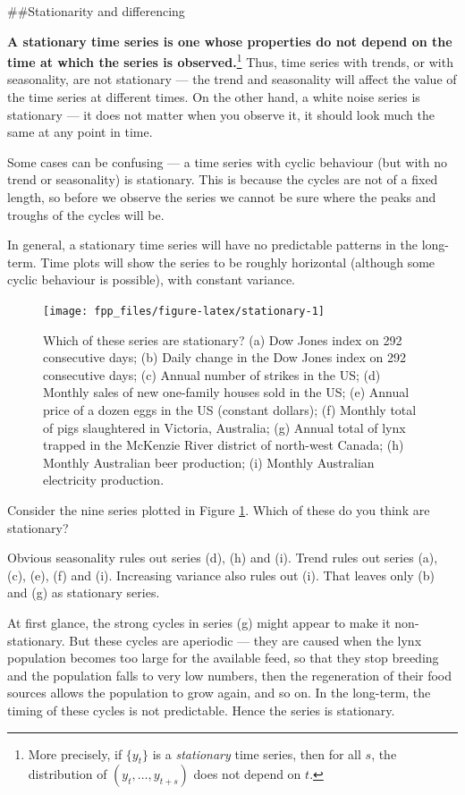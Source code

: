 \documentclass[]{book}
\let\rmarkdownfootnote\footnote%
\def\footnote{\protect\rmarkdownfootnote}
\begin{document}
\#\#Stationarity and differencing

\textbf{A stationary time series is one whose properties do not depend on the time at which the series is observed.}\footnote{More precisely, if \(\{y_t\}\) is a \emph{stationary} time series, then for all \(s\), the distribution of \((y_t,\dots,y_{t+s})\) does not depend on \(t\).} Thus, time series with trends, or with seasonality, are not stationary --- the trend and seasonality will affect the value of the time series at different times. On the other hand, a white noise series is stationary --- it does not matter when you observe it, it should look much the same at any point in time.

Some cases can be confusing --- a time series with cyclic behaviour (but with no trend or seasonality) is stationary. This is because the cycles are not of a fixed length, so before we observe the series we cannot be sure where the peaks and troughs of the cycles will be.

In general, a stationary time series will have no predictable patterns in the long-term. Time plots will show the series to be roughly horizontal (although some cyclic behaviour is possible), with constant variance.

\begin{figure}

{\centering \texttt{[image: fpp\_files/figure-latex/stationary-1]} 

}

\caption{Which of these series are stationary? (a) Dow Jones index on 292 consecutive days; (b) Daily change in the Dow Jones index on 292 consecutive days; (c) Annual number of strikes in the US; (d) Monthly sales of new one-family houses sold in the US; (e) Annual price of a dozen eggs in the US (constant dollars); (f) Monthly total of pigs slaughtered in Victoria, Australia; (g) Annual total of lynx trapped in the McKenzie River district of north-west Canada; (h) Monthly Australian beer production; (i) Monthly Australian electricity production.}\label{fig:stationary}
\end{figure}

Consider the nine series plotted in Figure \ref{fig:stationary}. Which of these do you think are stationary?

Obvious seasonality rules out series (d), (h) and (i). Trend rules out series (a), (c), (e), (f) and (i). Increasing variance also rules out (i). That leaves only (b) and (g) as stationary series.

At first glance, the strong cycles in series (g) might appear to make it non-stationary. But these cycles are aperiodic --- they are caused when the lynx population becomes too large for the available feed, so that they stop breeding and the population falls to very low numbers, then the regeneration of their food sources allows the population to grow again, and so on. In the long-term, the timing of these cycles is not predictable. Hence the series is stationary.
\end{document}
